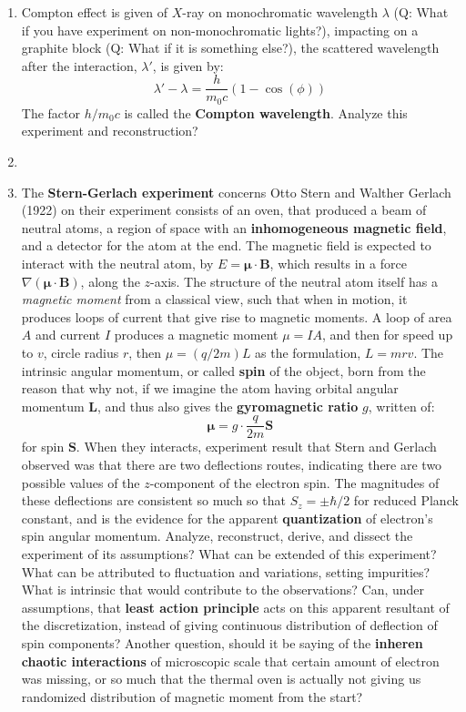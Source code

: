 \documentclass[10pt]{article}
\begin{document}
\begin{enumerate}[itemsep=1pt,topsep=1pt]
  \item Compton effect is given of $X$-ray on monochromatic wavelength $\lambda$ (Q: What if you have experiment on non-monochromatic lights?), impacting on a graphite block (Q: What if it is something else?), the scattered wavelength after the interaction, $\lambda'$, is given by: \begin{equation}
    \lambda' - \lambda = \frac{h}{m_{0}c} (1-\cos{(\phi)})
  \end{equation}
  The factor $h/m_{0}c$ is called the \textbf{Compton wavelength}. Analyze this experiment and reconstruction? 
  \item 
  \item The \textbf{Stern-Gerlach experiment} concerns Otto Stern and Walther Gerlach (1922) on their experiment consists of an oven, that produced a beam of neutral atoms, a region of space with an \textbf{inhomogeneous magnetic field}, and a detector for the atom at the end. The magnetic field is expected to interact with the neutral atom, by $E=\bm{\mu}\cdot \bm{B}$, which results in a force $\nabla (\bm{\mu}\cdot \bm{B})$, along the $z$-axis. The structure of the neutral atom itself has a \textit{magnetic moment} from a classical view, such that when in motion, it produces loops of current that give rise to magnetic moments. A loop of area $A$ and current $I$ produces a magnetic moment $\mu = IA$, and then for speed up to $v$, circle radius $r$, then $\mu =( q/2m)L$ as the formulation, $L=mrv$. The intrinsic angular momentum, or called \textbf{spin} of the object, born from the reason that why not, if we imagine the atom having orbital angular momentum $\mathbf{L}$, and thus also gives the \textbf{gyromagnetic ratio} $g$, written of: 
  \begin{equation}
    \bm{\mu} = g \cdot \frac{q}{2m} \mathbf{S}
  \end{equation}
  for spin $\mathbf{S}$. When they interacts, experiment result that Stern and Gerlach observed was that there are two deflections routes, indicating there are two possible values of the $z$-component of the electron spin. The magnitudes of these deflections are consistent so much so that $S_{z}=\pm \hbar /2$ for reduced Planck constant, and is the evidence for the apparent \textbf{quantization} of electron's spin angular momentum. Analyze, reconstruct, derive, and dissect the experiment of its assumptions? What can be extended of this experiment? What can be attributed to fluctuation and variations, setting impurities? What is intrinsic that would contribute to the observations? Can, under assumptions, that \textbf{least action principle} acts on this apparent resultant of the discretization, instead of giving continuous distribution of deflection of spin components? Another question, should it be saying of the \textbf{inheren chaotic interactions} of microscopic scale that certain amount of electron was missing, or so much that the thermal oven is actually not giving us randomized distribution of magnetic moment from the start? 

\end{enumerate}
\end{document}
